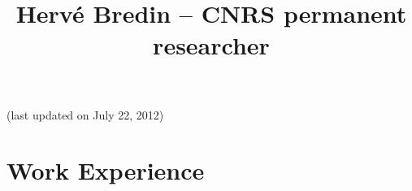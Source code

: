\documentclass{simplecv}
\begin{document}
\pagestyle{empty} 



\title{Herv\'{e} Bredin -- CNRS permanent researcher}

\maketitle

\vspace{-1cm}
\begin{center}
(last updated on July 22, 2012)
\end{center}

\section{Work Experience}
\end{document}
